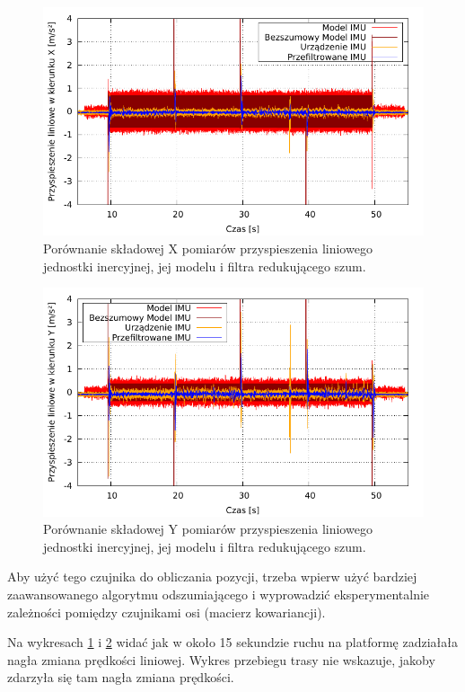 		\begin{figure}[H]
			\centering
			\includegraphics[width=\textwidth]{plots/imu_xt.pdf}
				\caption{Porównanie składowej X pomiarów przyspieszenia liniowego jednostki inercyjnej, jej modelu i filtra redukującego szum.}
			\label{plot:imu_xt}
		\end{figure}
		
		\begin{figure}[H]
			\centering
			\includegraphics[width=\textwidth]{plots/imu_yt.pdf}
				\caption{Porównanie składowej Y pomiarów przyspieszenia liniowego jednostki inercyjnej, jej modelu i filtra redukującego szum.}
			\label{plot:imu_yt}
		\end{figure}
		
		Aby użyć tego czujnika do obliczania pozycji, trzeba wpierw użyć bardziej zaawansowanego algorytmu odszumiającego i wyprowadzić eksperymentalnie zależności pomiędzy czujnikami
		osi (macierz kowariancji).
		
		Na wykresach \ref{plot:imu_xt} i \ref{plot:imu_yt} widać jak w około 15 sekundzie ruchu na platformę zadziałała nagła zmiana prędkości liniowej.
		Wykres przebiegu trasy nie wskazuje, jakoby zdarzyła się tam nagła zmiana prędkości.
	
